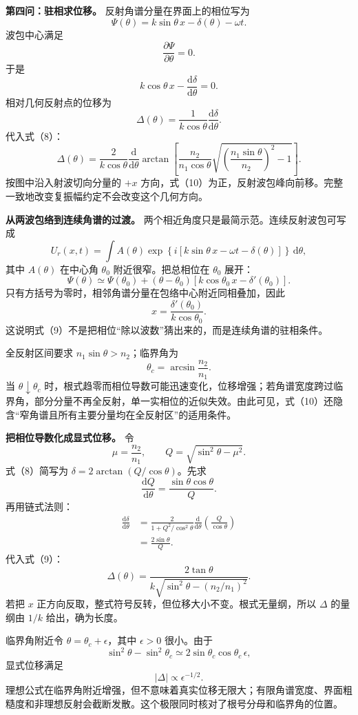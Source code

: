 \documentclass[12pt,a4paper,UTF8]{ctexart}
\begin{document}
\textbf{第四问：驻相求位移。} 反射角谱分量在界面上的相位写为 \[
\Psi(\theta)=k\sin\theta\,x-\delta(\theta)-\omega t.
\] 波包中心满足 \[
\frac{\partial\Psi}{\partial\theta}=0.
\] 于是 \[
k\cos\theta\,x-\frac{\mathrm d\delta}{\mathrm d\theta}=0.
\] 相对几何反射点的位移为 \[
\boxed{
\Delta(\theta)
=\frac1{k\cos\theta}
\frac{\mathrm d\delta}{\mathrm d\theta}
}. \tag{9}
\] 代入式（8）： \[
\boxed{
\Delta(\theta)
=\frac{2}{k\cos\theta}
\frac{\mathrm d}{\mathrm d\theta}
\arctan\left[
\frac{n_2}{n_1\cos\theta}
\sqrt{
\left(\frac{n_1\sin\theta}{n_2}\right)^2-1
}
\right]
}. \tag{10}
\] 按图中沿入射波切向分量的 \(+x\)
方向，式（10）为正，反射波包峰向前移。完整一致地改变复振幅约定不会改变这个几何方向。

\textbf{从两波包络到连续角谱的过渡。}
两个相近角度只是最简示范。连续反射波包可写成 \[
U_r(x,t)=\int A(\theta)
\exp\!\left\{i\left[k\sin\theta\,x-\omega t-\delta(\theta)\right]\right\}
\,\mathrm d\theta,
\] 其中 \(A(\theta)\) 在中心角 \(\theta_0\) 附近很窄。把总相位在
\(\theta_0\) 展开： \[
\Psi(\theta)\simeq\Psi(\theta_0)
+(\theta-\theta_0)
\left[k\cos\theta_0\,x-\delta'(\theta_0)\right].
\] 只有方括号为零时，相邻角谱分量在包络中心附近同相叠加，因此 \[
x=\frac{\delta'(\theta_0)}{k\cos\theta_0}.
\] 这说明式（9）不是把相位``除以波数''猜出来的，而是连续角谱的驻相条件。

全反射区间要求 \(n_1\sin\theta>n_2\)；临界角为 \[
\theta_c=\arcsin\frac{n_2}{n_1}.
\] 当 \(\theta\downarrow\theta_c\)
时，根式趋零而相位导数可能迅速变化，位移增强；若角谱宽度跨过临界角，部分分量不再全反射，单一实相位的近似失效。由此可见，式（10）还隐含``窄角谱且所有主要分量均在全反射区''的适用条件。

\textbf{把相位导数化成显式位移。} 令 \[
\mu=\frac{n_2}{n_1},\qquad
Q=\sqrt{\sin^2\theta-\mu^2}.
\] 式（8）简写为 \(\delta=2\arctan(Q/\cos\theta)\)。先求 \[
\frac{\mathrm dQ}{\mathrm d\theta}
=\frac{\sin\theta\cos\theta}{Q}.
\] 再用链式法则： \[
\begin{aligned}
\frac{\mathrm d\delta}{\mathrm d\theta}
&=\frac{2}{1+Q^2/\cos^2\theta}
\frac{\mathrm d}{\mathrm d\theta}
\left(\frac Q{\cos\theta}\right)\\
&=\frac{2\sin\theta}{Q}.
\end{aligned}
\] 代入式（9）： \[
\boxed{
\Delta(\theta)
=\frac{2\tan\theta}
{k\sqrt{\sin^2\theta-(n_2/n_1)^2}}
}.
\] 若把 \(x\) 正方向反取，整式符号反转，但位移大小不变。根式无量纲，所以
\(\Delta\) 的量纲由 \(1/k\) 给出，确为长度。

临界角附近令 \(\theta=\theta_c+\epsilon\)，其中 \(\epsilon>0\)
很小。由于 \[
\sin^2\theta-\sin^2\theta_c
\simeq2\sin\theta_c\cos\theta_c\,\epsilon,
\] 显式位移满足 \[
|\Delta|\propto\epsilon^{-1/2}.
\]
理想公式在临界角附近增强，但不意味着真实位移无限大；有限角谱宽度、界面粗糙度和非理想反射会截断发散。这个极限同时核对了根号分母和临界角的位置。
\end{document}
